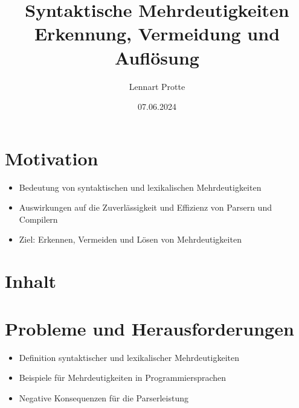 \documentclass[t]{beamer}
\begin{document}

\title{Syntaktische Mehrdeutigkeiten \\ Erkennung, Vermeidung und Auflösung}
\date{07.06.2024}
\author{Lennart Protte}

\frame{\titlepage}


\section{Motivation}
\begin{frame}
\begin{itemize}
    \item Bedeutung von syntaktischen und lexikalischen Mehrdeutigkeiten
    \item Auswirkungen auf die Zuverlässigkeit und Effizienz von Parsern und Compilern
    \item Ziel: Erkennen, Vermeiden und Lösen von Mehrdeutigkeiten
\end{itemize}
\end{frame}

\section{Inhalt}
\begin{frame}
\tableofcontents
\end{frame}

\section{Probleme und Herausforderungen}\label{sec:probleme-und-herausforderungen}
\begin{frame}
\begin{itemize}
    \item Definition syntaktischer und lexikalischer Mehrdeutigkeiten
    \item Beispiele für Mehrdeutigkeiten in Programmiersprachen
    \item Negative Konsequenzen für die Parserleistung
\end{itemize}
\end{frame}
\end{document}
